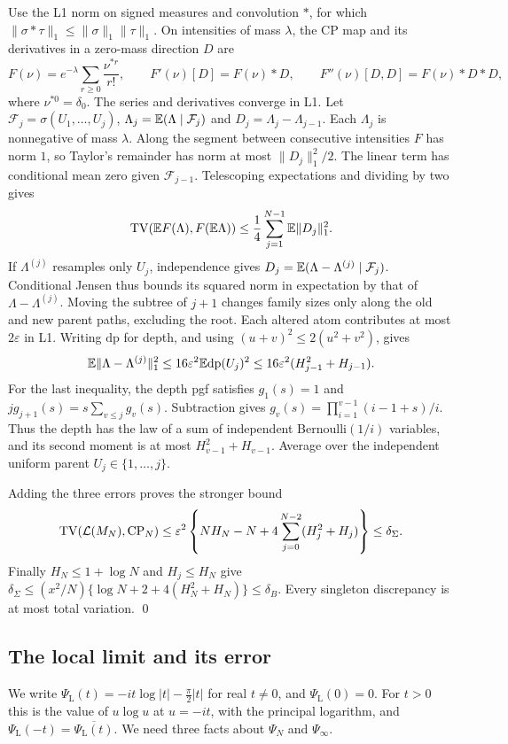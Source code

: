Use the L1 norm on signed measures and convolution $*$, for which
$\|\sigma*\tau\|_1\le\|\sigma\|_1\|\tau\|_1$. On intensities of mass
$\lambda$, the CP map and its derivatives in a zero-mass direction $D$ are
\[
 F(\nu)=e^{-\lambda}\sum_{r\ge0}\frac{\nu^{*r}}{r!},\qquad
 F'(\nu)[D]=F(\nu)*D,\qquad F''(\nu)[D,D]=F(\nu)*D*D,
\]
where $\nu^{*0}=\delta_0$. The series and derivatives converge in L1.
Let $\mathcal F_j=\sigma(U_1,\ldots,U_j)$,
$\Lambda_j=\mathbb{E}(\Lambda\mid\mathcal F_j)$ and
$D_j=\Lambda_j-\Lambda_{j-1}$. Each $\Lambda_j$ is nonnegative of mass
$\lambda$. Along the segment between consecutive intensities $F$ has norm
$1$, so Taylor's remainder has norm at most $\|D_j\|_1^2/2$.
The linear term has conditional mean zero given $\mathcal F_{j-1}$.
Telescoping expectations and dividing by two gives
\[
 \operatorname{TV}(\mathbb{E} F(\Lambda),F(\mathbb{E}\Lambda))
 \le\frac14\sum_{j=1}^{N-1}\mathbb{E}\|D_j\|_1^2.
\]
If $\Lambda^{(j)}$ resamples only $U_j$, independence gives
$D_j=\mathbb{E}(\Lambda-\Lambda^{(j)}\mid\mathcal F_j)$.
Conditional Jensen thus bounds its squared norm in expectation by that of
$\Lambda-\Lambda^{(j)}$. Moving the subtree of $j+1$ changes family sizes
only along the old and new parent paths, excluding the root. Each altered
atom contributes at most $2\varepsilon$ in L1. Writing $\mathrm{dp}$ for
depth, and using $(u+v)^2\le2(u^2+v^2)$, gives
\[
 \mathbb{E}\|\Lambda-\Lambda^{(j)}\|_1^2
 \le16\varepsilon^2\mathbb{E}\mathrm{dp}(U_j)^2
 \le16\varepsilon^2(H_{j-1}^2+H_{j-1}).
\]
For the last inequality, the depth pgf satisfies $g_1(s)=1$ and
$j g_{j+1}(s)=s\sum_{v\le j}g_v(s)$. Subtraction gives
$g_v(s)=\prod_{i=1}^{v-1}(i-1+s)/i$. Thus the depth has the law of a sum
of independent Bernoulli$(1/i)$ variables, and its second moment is at
most $H_{v-1}^2+H_{v-1}$. Average over the independent uniform parent
$U_j\in\{1,\ldots,j\}$.

Adding the three errors proves the stronger bound
\[
 \operatorname{TV}(\mathcal L(M_N),\mathrm{CP}_N)
 \le\varepsilon^2\left\{NH_N-N+
       4\sum_{j=0}^{N-2}(H_j^2+H_j)\right\}
 \le\delta_\Sigma.
\]
Finally $H_N\le1+\log N$ and $H_j\le H_N$ give
$\delta_\Sigma\le(x^2/N)\{\log N+2+4(H_N^2+H_N)\}\le\delta_B$.
Every singleton discrepancy is at most total variation. \qed

\subsection{The local limit and its error}\label{app:bulk-landau}

We write $\Psi_{\mathrm L}(t)=-it\log\lvert t\rvert-\frac\pi2\lvert t\rvert$ for real
$t\ne0$, and $\Psi_{\mathrm L}(0)=0$. For $t>0$ this is the value of $u\log u$ at $u=-it$,
with the principal logarithm, and $\Psi_{\mathrm L}(-t)=\overline{\Psi_{\mathrm L}(t)}$. We need three
facts about $\Psi_N$ and $\Psi_\infty$.

